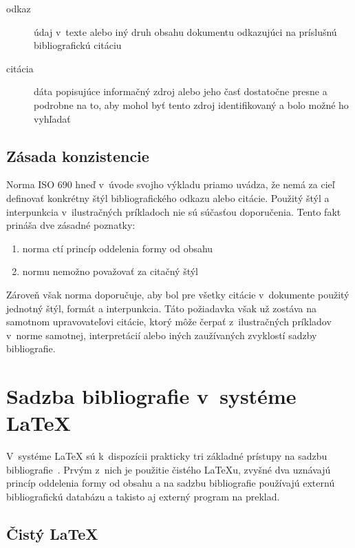 \documentclass{csbulletin}
\begin{document}
\begin{refsection}
\begin{description}
\item[odkaz] údaj v~texte alebo iný druh obsahu dokumentu odkazujúci
  na príslušnú bibliografickú citáciu
\item[citácia] dáta popisujúce informačný zdroj alebo jeho časť
  dostatočne presne a podrobne na to, aby mohol byť tento zdroj
  identifikovaný a bolo možné ho vyhľadať
\end{description}

\subsection{Zásada konzistencie}

Norma ISO 690 hneď v~úvode svojho výkladu priamo uvádza, že nemá za
cieľ definovať konkrétny štýl bibliografického odkazu alebo citácie.
Použitý štýl a interpunkcia v~ilustračných príkladoch nie sú súčasťou
doporučenia. Tento fakt prináša dve zásadné poznatky:

\begin{enumerate}
\item norma ctí princíp oddelenia formy od obsahu
\item normu nemožno považovať za citačný štýl~\cite{Hala2013}
\end{enumerate}

\noindent Zároveň však norma doporučuje, aby bol pre všetky citácie
v~dokumente použitý jednotný štýl, formát a interpunkcia. Táto
požiadavka však už zostáva na samotnom upravovateľovi citácie, ktorý
môže čerpať z~ilustračných príkladov v~norme samotnej, interpretácií
alebo iných zaužívaných zvyklostí sadzby bibliografie.


\section{Sadzba bibliografie v~systéme \LaTeX{}}

V~systéme \LaTeX{} sú k~dispozícii prakticky tri základné prístupy na
sadzbu bibliografie~\cite{talbot2013}. Prvým z~nich je použitie
čistého \LaTeX{}u, zvyšné dva uznávajú princíp oddelenia formy od
obsahu a na sadzbu bibliografie používajú externú bibliografickú
databázu a takisto aj externý program na preklad.

\subsection{Čistý \LaTeX}\label{bib:pure:latex}


\end{refsection}
\end{document}

